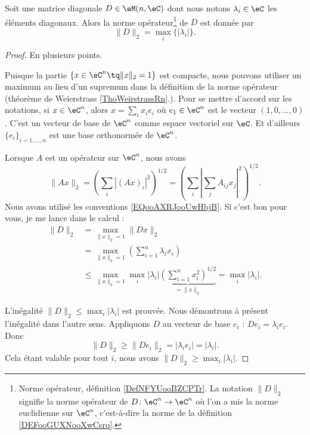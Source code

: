 \begin{lemma}        \label{LEMooCSBVooZzqxqg}
	Soit une matrice diagonale \( D\in \eM(n,\eC)\) dont nous notons \( \lambda_i\in \eC\) les éléments diagonaux. Alors la norme opérateur\footnote{Norme opérateur, définition \ref{DefNFYUooBZCPTr}. La notation \( \| D \|_2\) signifie la norme opérateur de \( D\colon \eC^n\to \eC^n\) où l'on a mis la norme euclidienne sur \( \eC^n\), c'est-à-dire la norme de la définition \ref{DEFooGUXNooXwCsrq}.} de \( D\) est donnée par
	\begin{equation}
		\| D \|_2=\max_i\{ | \lambda_i | \}.
	\end{equation}
\end{lemma}

\begin{proof}
	En plusieurs points.
	\begin{subproof}
		\spitem[Le compact]
		Puisque la partie \( \{ x\in \eC^n\tq \| x \|_2=1 \}\) est compacte, nous pouvons utiliser un maximum au lieu d'un supremum dans la définition de la norme opérateur (théorème de Weierstrass \ref{ThoWeirstrassRn}.).
		Pour se mettre d'accord sur les notations, si \( x\in \eC^n\), alors \( x=\sum_ix_ie_i\) où \( e_1\in \eC^n\) est le vecteur \( (1, 0,\ldots, 0)\). C'est un vecteur de base de \( \eC^n\) comme espace vectoriel sur \( \eC\). Et d'ailleurs \( \{ e_i \}_{i=1,\ldots, n}\) est une base orthonormée de \( \eC^n\).

		Lorsque \( A\) est un opérateur sur \( \eC^n\), nous avons
		\begin{equation}
			\| Ax \|_2=\left( \sum_i| (Ax)_i |^2 \right)^{1/2}
			=\left( \sum_i \left| \sum_jA_{ij}x_j \right|^2 \right)^{1/2}.
		\end{equation}
		Nous avons utilisé les conventions \eqref{EQooAXRJooUwHbjB}.
		\spitem[Le calcul]
		Si c'est bon pour vous, je me lance dans le calcul :
		\begin{subequations}
			\begin{align}
				\| D \|_2 & =\max_{\| x \|_2=1}\| Dx \|_2                                                                              \\
				          & =\max_{\| x \|_2=1}   \left( \sum_{i=1}^n\lambda_ix_i \right)                                              \\
				          & \leq \max_{\| x \|_2=1}\max_i| \lambda_i |\underbrace{\left( \sum_{i=1}^nx_i^2 \right)^{1/2}}_{=\| x \|_2}
				=\max_i| \lambda_i |.
			\end{align}
		\end{subequations}
	\end{subproof}
	L'inégalité \( \| D \|_2\leq \max_i| \lambda_i |\) est prouvée. Nous démontrons à présent l'inégalité dans l'autre sens. Appliquons \( D\) au vecteur de base \( e_i\) : \( De_i=\lambda_ie_i\). Donc
	\begin{equation}
		\| D \|_2\geq \| De_i \|_2=| \lambda_ie_i |=| \lambda_i |.
	\end{equation}
	Cela étant valable pour tout \( i\), nous avons \( \| D \|_2\geq\max_i| \lambda_i |\).
\end{proof}


